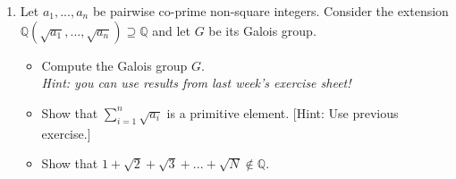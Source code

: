 \documentclass[12pt,a4paper]{article}
\begin{document}
\begin{enumerate}
\newpage 

\item 
Let $a_1, ..., a_n$ be pairwise co-prime non-square integers. Consider the extension $\mathbb{Q}(\sqrt{a_1}, ... , \sqrt{a_n})\supseteq \mathbb{Q}$ and let $G$ be its Galois group.
\begin{itemize}
\item Compute the Galois group $G$. \\
\textit{Hint: you can use results from last week's exercise sheet!}
\item Show that $\sum_{i=1}^{n}\sqrt{a_i}$ is a primitive element. [Hint: Use previous exercise.]
\item Show that $1 + \sqrt{2} + \sqrt{3} + ... + \sqrt{N} \notin \mathbb{Q}$.
\end{itemize}

\end{enumerate}
\end{document}
